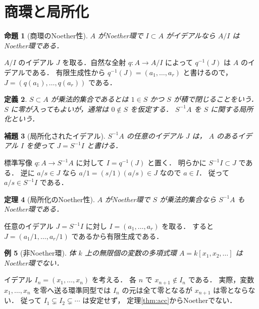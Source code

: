 \documentclass[a5paper,10pt,onecolumn]{jsarticle}
\makeatletter
\theoremstyle{mathnotetheorem}
\newtheorem{theorem}{定理}[section]
\newtheorem{definition}[theorem]{定義}
\newtheorem{lemma}[theorem]{補題}
\newtheorem{proposition}[theorem]{命題}
\newtheorem{example}[theorem]{例}
\renewcommand{\proofname}{証明}
\renewenvironment{proof}[1][\proofname]{%
  \par\pushQED{\qed}\normalfont\topsep4\p@\@plus2\p@\relax
  \trivlist\item[\hskip\labelsep\bfseries #1]\ignorespaces
}{\popQED\endtrivlist\@endpefalse}
\makeatother
\begin{document}
\section{商環と局所化}
\begin{proposition}[商環のNoether性]\label{prop:quot}
$A$ がNoether環で $I\subset A$ がイデアルなら
$A/I$ はNoether環である．
\end{proposition}
\begin{proof}
$A/I$ のイデアル $J$ を取る．自然な全射
$q:A\to A/I$ によって $q^{-1}(J)$ は $A$ のイデアルである．
有限生成性から $q^{-1}(J)=(a_1,\ldots,a_r)$ と書けるので，
$J=(q(a_1),\ldots,q(a_r))$ である．
\end{proof}
\begin{definition}
$S\subset A$ が乗法的集合であるとは
$1\in S$ かつ $S$ が積で閉じることをいう．
$S$ に零が入ってもよいが，通常は $0\notin S$ を仮定する．
$S^{-1}A$ を $S$ に関する局所化という．
\end{definition}
\begin{lemma}[局所化されたイデアル]
$S^{-1}A$ の任意のイデアル $J$ は，
$A$ のあるイデアル $I$ を使って $J=S^{-1}I$ と書ける．
\end{lemma}
\begin{proof}
標準写像 $q:A\to S^{-1}A$ に対して $I=q^{-1}(J)$ と置く．
明らかに $S^{-1}I\subset J$ である．
逆に $a/s\in J$ なら
$a/1=(s/1)(a/s)\in J$ なので $a\in I$．
従って $a/s\in S^{-1}I$ である．
\end{proof}
\begin{theorem}[局所化のNoether性]
$A$ がNoether環で $S$ が乗法的集合なら
$S^{-1}A$ もNoether環である．
\end{theorem}
\begin{proof}
任意のイデアル $J=S^{-1}I$ に対し
$I=(a_1,\ldots,a_r)$ を取る．
すると $J=(a_1/1,\ldots,a_r/1)$ であるから有限生成である．
\end{proof}
\begin{example}[非Noether環]
体 $k$ 上の無限個の変数の多項式環
$A=k[x_1,x_2,\ldots]$ はNoether環でない．
\end{example}
\begin{proof}
イデアル $I_n=(x_1,\ldots,x_n)$ を考える．
各 $n$ で $x_{n+1}\notin I_n$ である．
実際，変数 $x_1,\ldots,x_n$ を零へ送る環準同型では
$I_n$ の元は全て零となるが $x_{n+1}$ は零とならない．
従って $I_1\subsetneq I_2\subsetneq\cdots$ は安定せず，
定理\ref{thm:acc}からNoetherでない．
\end{proof}
\end{document}
